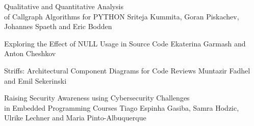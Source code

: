 \documentclass[12pt,twoside]{book}
\newcommand{\nospell}[1]{#1}
\begin{document}
  {\nospell{Qualitative and Quantitative Analysis \\ of Callgraph Algorithms for PYTHON}}
  {\nospell{Sriteja Kummita, Goran Piskachev, \\ Johannes Spaeth and Eric Bodden}}

  {\nospell{Exploring the Effect of NULL Usage in Source Code}}
  {\nospell{Ekaterina Garmash and Anton Cheshkov}}

  {\nospell{Striffs: Architectural Component Diagrams for Code Reviews}}
  {\nospell{Muntazir Fadhel and Emil Sekerinski}}

  {\nospell{Raising Security Awareness using Cybersecurity Challenges \\ in Embedded Programming Courses}}
  {\nospell{Tiago Espinha Gasiba, Samra Hodzic, \\ Ulrike Lechner and Maria Pinto-Albuquerque}}

\label{ref:index}
\printindex
\thispagestyle{empty}
\end{document}
